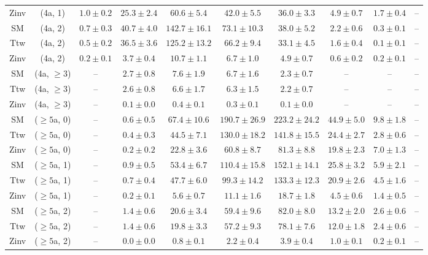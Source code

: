 \begin{table}[h!]
{\begin{tabular}{cccccccccc}
	Zinv & (4a, 1) & $1.0\pm 0.2$ & $25.3\pm 2.4$ & $60.6\pm 5.4$ & $42.0\pm 5.5$ & $36.0\pm 3.3$ & $4.9\pm 0.7$ & $1.7\pm 0.4$ & -- \\[0.5ex] 
	SM & (4a, 2) & $0.7\pm 0.3$ & $40.7\pm 4.0$ & $142.7\pm 16.1$ & $73.1\pm 10.3$ & $38.0\pm 5.2$ & $2.2\pm 0.6$ & $0.3\pm 0.1$ & -- \\[0.5ex] 
	Ttw & (4a, 2) & $0.5\pm 0.2$ & $36.5\pm 3.6$ & $125.2\pm 13.2$ & $66.2\pm 9.4$ & $33.1\pm 4.5$ & $1.6\pm 0.4$ & $0.1\pm 0.1$ & -- \\[0.5ex] 
	Zinv & (4a, 2) & $0.2\pm 0.1$ & $3.7\pm 0.4$ & $10.7\pm 1.1$ & $6.7\pm 1.0$ & $4.9\pm 0.7$ & $0.6\pm 0.2$ & $0.2\pm 0.1$ & -- \\[0.5ex] 
	SM & (4a, $\ge3$) & -- & $2.7\pm 0.8$ & $7.6\pm 1.9$ & $6.7\pm 1.6$ & $2.3\pm 0.7$ & -- & -- & -- \\[0.5ex] 
	Ttw & (4a, $\ge3$) & -- & $2.6\pm 0.8$ & $6.6\pm 1.7$ & $6.3\pm 1.5$ & $2.2\pm 0.7$ & -- & -- & -- \\[0.5ex] 
	Zinv & (4a, $\ge3$) & -- & $0.1\pm 0.0$ & $0.4\pm 0.1$ & $0.3\pm 0.1$ & $0.1\pm 0.0$ & -- & -- & -- \\[0.5ex] 
	SM & ($\ge5$a, 0) & -- & $0.6\pm 0.5$ & $67.4\pm 10.6$ & $190.7\pm 26.9$ & $223.2\pm 24.2$ & $44.9\pm 5.0$ & $9.8\pm 1.8$ & -- \\[0.5ex] 
	Ttw & ($\ge5$a, 0) & -- & $0.4\pm 0.3$ & $44.5\pm 7.1$ & $130.0\pm 18.2$ & $141.8\pm 15.5$ & $24.4\pm 2.7$ & $2.8\pm 0.6$ & -- \\[0.5ex] 
	Zinv & ($\ge5$a, 0) & -- & $0.2\pm 0.2$ & $22.8\pm 3.6$ & $60.8\pm 8.7$ & $81.3\pm 8.8$ & $19.8\pm 2.3$ & $7.0\pm 1.3$ & -- \\[0.5ex] 
	SM & ($\ge5$a, 1) & -- & $0.9\pm 0.5$ & $53.4\pm 6.7$ & $110.4\pm 15.8$ & $152.1\pm 14.1$ & $25.8\pm 3.2$ & $5.9\pm 2.1$ & -- \\[0.5ex] 
	Ttw & ($\ge5$a, 1) & -- & $0.7\pm 0.4$ & $47.7\pm 6.0$ & $99.3\pm 14.2$ & $133.3\pm 12.3$ & $20.9\pm 2.6$ & $4.5\pm 1.6$ & -- \\[0.5ex] 
	Zinv & ($\ge5$a, 1) & -- & $0.2\pm 0.1$ & $5.6\pm 0.7$ & $11.1\pm 1.6$ & $18.7\pm 1.8$ & $4.5\pm 0.6$ & $1.4\pm 0.5$ & -- \\[0.5ex] 
	SM & ($\ge5$a, 2) & -- & $1.4\pm 0.6$ & $20.6\pm 3.4$ & $59.4\pm 9.6$ & $82.0\pm 8.0$ & $13.2\pm 2.0$ & $2.6\pm 0.6$ & -- \\[0.5ex] 
	Ttw & ($\ge5$a, 2) & -- & $1.4\pm 0.6$ & $19.8\pm 3.3$ & $57.2\pm 9.3$ & $78.1\pm 7.6$ & $12.0\pm 1.8$ & $2.4\pm 0.6$ & -- \\[0.5ex] 
	Zinv & ($\ge5$a, 2) & -- & $0.0\pm 0.0$ & $0.8\pm 0.1$ & $2.2\pm 0.4$ & $3.9\pm 0.4$ & $1.0\pm 0.1$ & $0.2\pm 0.1$ & -- \\[0.5ex] 

\end{tabular}}
\end{table}
